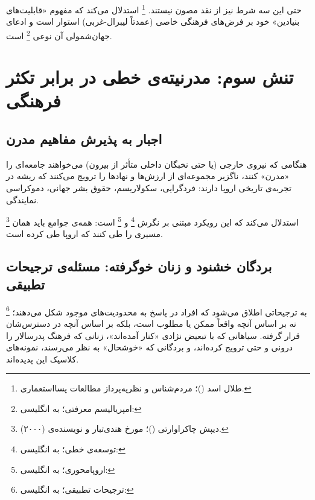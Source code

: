 \begin{tcolorbox}[wavebox, title={نکته‌ی انتقادی}]
	حتی این سه شرط نیز از نقد مصون نیستند.
	\footnote{%
		طلال اسد ()؛%
		مردم‌شناس و نظریه‌پرداز مطالعات پسااستعماری.%
	}%
	استدلال می‌کند که مفهوم «قابلیت‌های بنیادین» خود بر فرض‌های
	فرهنگی خاصی (عمدتاً لیبرال-غربی) استوار است و ادعای جهان‌شمولی
	آن نوعی %
	\footnote{امپریالیسم معرفتی؛ به انگلیسی: }%
	است.
\end{tcolorbox}


\section{تنش سوم: مدرنیته‌ی خطی در برابر تکثر فرهنگی}
\label{sec:ch02-tension3}

\subsection{اجبار به پذیرش مفاهیم مدرن}
\label{subsec:ch02-t3-coercion}

هنگامی که نیروی خارجی (یا حتی نخبگان داخلی متأثر از بیرون)
می‌خواهند جامعه‌ای را «مدرن» کنند، ناگزیر مجموعه‌ای از ارزش‌ها
و نهادها را ترویج می‌کنند که ریشه در تجربه‌ی تاریخی اروپا
دارند: فردگرایی، سکولاریسم، حقوق بشر جهانی، دموکراسی نمایندگی.

%
\footnote{%
	دیپش چاکراوارتی ()؛%
	مورخ هندی‌تبار و نویسنده‌ی%
	 (۲۰۰۰).%
}%
استدلال می‌کند که این رویکرد مبتنی بر نگرش
%
\footnote{توسعه‌ی خطی؛ به انگلیسی:
	}%
و %
\footnote{اروپامحوری؛ به انگلیسی: }%
است: همه‌ی جوامع باید همان مسیری را طی کنند که اروپا طی کرده
است.

\subsection{بردگان خشنود و زنان خوگرفته: مسئله‌ی ترجیحات تطبیقی}
\label{subsec:ch02-t3-adaptive}

\begin{tcolorbox}[defbox, title={مفهوم: ترجیحات تطبیقی}]
	\footnote{ترجیحات تطبیقی؛ به انگلیسی: }%
	به ترجیحاتی اطلاق می‌شود که افراد در پاسخ به محدودیت‌های موجود
	شکل می‌دهند؛ نه بر اساس آنچه واقعاً ممکن یا مطلوب است، بلکه
	بر اساس آنچه در دسترس‌شان قرار گرفته. سیاهانی که با تبعیض نژادی
	«کنار آمده‌اند»، زنانی که فرهنگ پدرسالار را درونی و حتی ترویج
	کرده‌اند، و بردگانی که «خوشحال» به نظر می‌رسند، نمونه‌های
	کلاسیک این
	پدیده‌اند.
\end{tcolorbox}

